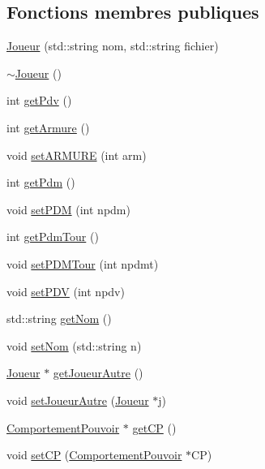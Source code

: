 \subsection*{\-Fonctions membres publiques}
\begin{DoxyCompactItemize}
\item 
\hyperlink{class_joueur_a055a0bc38f47a424243d44e7078af129}{\-Joueur} (std\-::string nom, std\-::string fichier)
\item 
\hyperlink{class_joueur_a9fb594f755601ee77ce5884c4c0861f3}{$\sim$\-Joueur} ()
\item 
int \hyperlink{class_joueur_a3deefa81ebbb921d6cef52322777dee7}{get\-Pdv} ()
\item 
int \hyperlink{class_joueur_adab9394b18e1e65a77aa8dad7b51ec28}{get\-Armure} ()
\item 
void \hyperlink{class_joueur_a2ff017f6e65cad383d00d153ece08045}{set\-A\-R\-M\-U\-R\-E} (int arm)
\item 
int \hyperlink{class_joueur_ac950c36b21e1dfc7038d9bb4e1f53361}{get\-Pdm} ()
\item 
void \hyperlink{class_joueur_a199d04e5240f4078ba2f3da2431f0bb2}{set\-P\-D\-M} (int npdm)
\item 
int \hyperlink{class_joueur_ab9297495de7521ac2198c7ce8d38191c}{get\-Pdm\-Tour} ()
\item 
void \hyperlink{class_joueur_a3984848768db7e175aeeb51ca89e4eb3}{set\-P\-D\-M\-Tour} (int npdmt)
\item 
void \hyperlink{class_joueur_ac4b9408bed0a64ac63188f7f8e1a73d9}{set\-P\-D\-V} (int npdv)
\item 
std\-::string \hyperlink{class_joueur_a5ba8036208a35efd6bf37a86b36063b0}{get\-Nom} ()
\item 
void \hyperlink{class_joueur_afa24ba80453522ff059e7e6f46653749}{set\-Nom} (std\-::string n)
\item 
\hyperlink{class_joueur}{\-Joueur} $\ast$ \hyperlink{class_joueur_a0a2f88581ef12441b03a1cc4ed721b40}{get\-Joueur\-Autre} ()
\item 
void \hyperlink{class_joueur_a81aa9fca9a001be893bfaa607681b086}{set\-Joueur\-Autre} (\hyperlink{class_joueur}{\-Joueur} $\ast$j)
\item 
\hyperlink{class_comportement_pouvoir}{\-Comportement\-Pouvoir} $\ast$ \hyperlink{class_joueur_a85df9863c4257fe7405a6b1fe7c1e1ef}{get\-C\-P} ()
\item 
void \hyperlink{class_joueur_a7b408ea957e1b125a509ec8e88b2c148}{set\-C\-P} (\hyperlink{class_comportement_pouvoir}{\-Comportement\-Pouvoir} $\ast$\-C\-P)

\end{DoxyCompactItemize}
